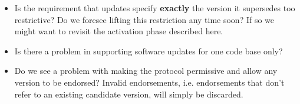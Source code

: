 \begin{itemize}
\item Is the requirement that updates specify \textbf{exactly} the version it
  supersedes too restrictive? Do we foresee lifting this restriction any time
  soon? If so we might want to revisit the activation phase described here.
\item Is there a problem in supporting software updates for one code base only?
\item Do we see a problem with making the protocol permissive and allow any
  version to be endorsed? Invalid endorsements, i.e. endorsements that don't
  refer to an existing candidate version, will simply be discarded.
\end{itemize}


